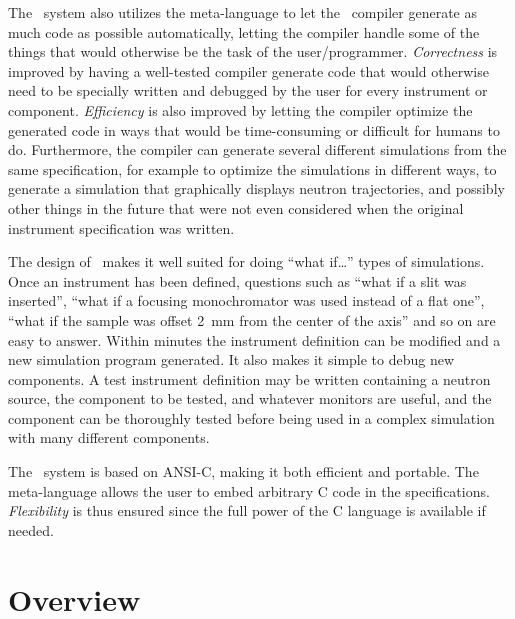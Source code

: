 The \MCS\ system also utilizes the meta-language to let the \MCS\
compiler generate as much code as possible automatically, letting the
compiler handle some of the things that would otherwise be the task of
the user/programmer. \textit{Correctness} is improved by having a well-tested
compiler generate code that would otherwise need to be specially written
and debugged by the user for every instrument or component. \textit{Efficiency}
is also improved by letting the compiler optimize the generated code in
ways that would be time-consuming or difficult for humans to do. Furthermore, the
compiler can generate several different simulations from the same
specification, for example to optimize the simulations in different
ways, to generate a simulation that graphically displays neutron
trajectories, and possibly other things in the future that were not even
considered when the original instrument specification was written.

The design of \MCS\ makes it well suited for doing ``what if\ldots''
types of simulations. Once an instrument has been defined, questions
such as ``what if a slit was inserted'', ``what if a focusing
monochromator was used instead of a flat one'', ``what if the sample was
offset 2~mm from the center of the axis'' and so on are easy to answer. Within
minutes the instrument definition can be modified and a
new simulation program generated. It also makes it simple to debug new
components. A test instrument definition may be written
containing a neutron source, the component to be tested, and whatever
monitors are useful, and the component can be thoroughly tested before
being used in a complex simulation with many different components.

The \MCS\ system is based on ANSI-C, making it both efficient and
portable. The meta-language allows the user to embed arbitrary C code in
the specifications. \textit{Flexibility} is thus ensured since the full
power of the C language is available if needed.


\section{Overview}

